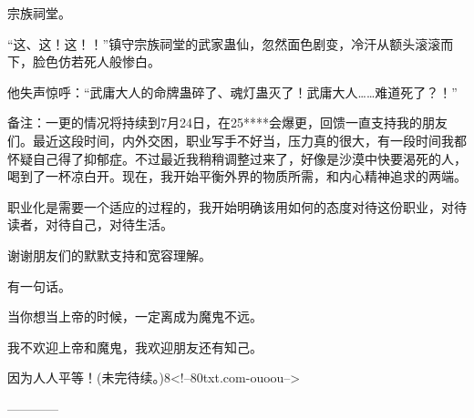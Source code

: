 \begin{this_body}
宗族祠堂。

“这、这！这！！”镇守宗族祠堂的武家蛊仙，忽然面色剧变，冷汗从额头滚滚而下，脸色仿若死人般惨白。

他失声惊呼：“武庸大人的命牌蛊碎了、魂灯蛊灭了！武庸大人……难道死了？！”

备注：一更的情况将持续到7月24日，在25****会爆更，回馈一直支持我的朋友们。最近这段时间，内外交困，职业写手不好当，压力真的很大，有一段时间我都怀疑自己得了抑郁症。不过最近我稍稍调整过来了，好像是沙漠中快要渴死的人，喝到了一杯凉白开。现在，我开始平衡外界的物质所需，和内心精神追求的两端。

职业化是需要一个适应的过程的，我开始明确该用如何的态度对待这份职业，对待读者，对待自己，对待生活。

谢谢朋友们的默默支持和宽容理解。

有一句话。

当你想当上帝的时候，一定离成为魔鬼不远。

我不欢迎上帝和魔鬼，我欢迎朋友还有知己。

因为人人平等！(未完待续。)8<!--80txt.com-ouoou-->

------------

\end{this_body}

